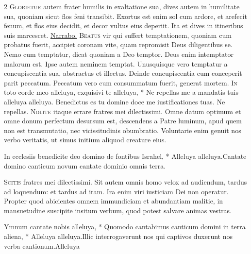 \begin{multicols*}{2}
\lettrine[lines=2]{\zallmancaps \color{Blue} G}{lorietur} autem frater humilis in exaltatione sua, dives autem in humilitate sua, quoniam sicut flos feni transibit. Exortus est enim sol cum ardore, et arefecit fenum, et flos eius decidit, et decor vultus eius deperiit. Ita et dives in itineribus suis marcescet. \R \hyperlink{narrabo-nomen}{Narrabo.}
\lettrine[lines=2]{\zallmancaps \color{Red} B}{eatus} vir qui suffert temptationem, quoniam cum probatus fuerit, accipiet coronam vite, quam repromisit Deus diligentibus se. Nemo cum temptatur, dicat quoniam a Deo temptor. Deus enim intemptator malorum est. Ipse autem neminem temptat. Unusquisque vero temptatur a concupiscentia sua, abstractus et illectus. Deinde concupiscentia cum conceperit parit peccatum. Peccatum vero cum consummatum fuerit, generat mortem. \R
\lettrine[lines=2]{\zallmancaps \color{Blue} I}{n} \hypertarget{in-toto-corde}{\label{in-toto-corde}} toto corde meo alleluya, exquisivi te alleluya, * Ne repellas me a mandatis tuis alleluya alleluya. \V Benedictus es tu domine doce me iustificationes tuas. Ne repellas.
\lettrine[lines=2]{\zallmancaps \color{Red} N}{olite} itaque errare fratres mei dilectissimi. Omne datum optimum et omne donum perfectum desursum est, descendens a Patre luminum, apud quem non est transmutatio, nec vicissitudinis obumbratio. Voluntarie enim genuit nos verbo veritatis, ut simus initium aliquod creature eius.
\begin{responsory}[in-ecclesiis]
{In ecclesiis benedicite deo domino de fontibus Israhel, * Alleluya alleluya.}{Cantate domino canticum novum cantate dominio omnis terra.}
\end{responsory}%
\lettrine[lines=2]{\zallmancaps \color{Blue} S}{citis} fratres mei dilectissimi. Sit autem omnis homo velox ad audiendum, tardus ad loquendum: et tardus ad iram. Ira enim viri iusticiam Dei non operatur. Propter quod abicientes omnem immundiciam et abundantiam malitie, in mansuetudine suscipite insitum verbum, quod potest salvare animas vestras.
\begin{responsory-final}
{Ymnum cantate nobis alleluya, * Quomodo cantabimus canticum domini in terra aliena, * Alleluya alleluya.}{Illic interrogaverunt nos qui captivos duxerunt nos verba cantionum.}{Alleluya}

\end{responsory-final}
\end{multicols*}
